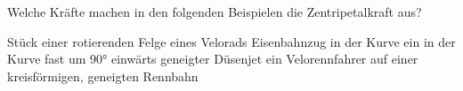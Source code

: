 Welche Kräfte machen in den folgenden Beispielen die Zentripetalkraft aus?

\begin{abcliste}
\abc Stück einer rotierenden Felge eines Velorads
\abc Eisenbahnzug in der Kurve
\abc ein in der Kurve fast um \ang{90} einwärts geneigter Düsenjet
\abc ein Velorennfahrer auf einer kreisförmigen, geneigten Rennbahn
\end{abcliste}
